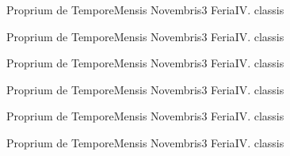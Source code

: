 \documentclass[liber-responsorialis_aestivus.tex]{subfiles}
\begin{document}
\sixlinesvspace

	{Proprium de Tempore}{Mensis Novembris}{3}{}
	{Feria}{IV. classis}{}
	{}
	{}

	{Proprium de Tempore}{Mensis Novembris}{3}{}
	{Feria}{IV. classis}{}
	{}
	{}
\pagebreak
\sixlinesvspace
{}
\sixlinesvspace
\pagebreak

	{Proprium de Tempore}{Mensis Novembris}{3}{}
	{Feria}{IV. classis}{}
	{}
	{}
\pagebreak
{}

	{Proprium de Tempore}{Mensis Novembris}{3}{}
	{Feria}{IV. classis}{}
	{}
	{}

	{Proprium de Tempore}{Mensis Novembris}{3}{}
	{Feria}{IV. classis}{}
	{}
	{}

	{Proprium de Tempore}{Mensis Novembris}{3}{}
	{Feria}{IV. classis}{}
	{}
	{}
\end{document}
